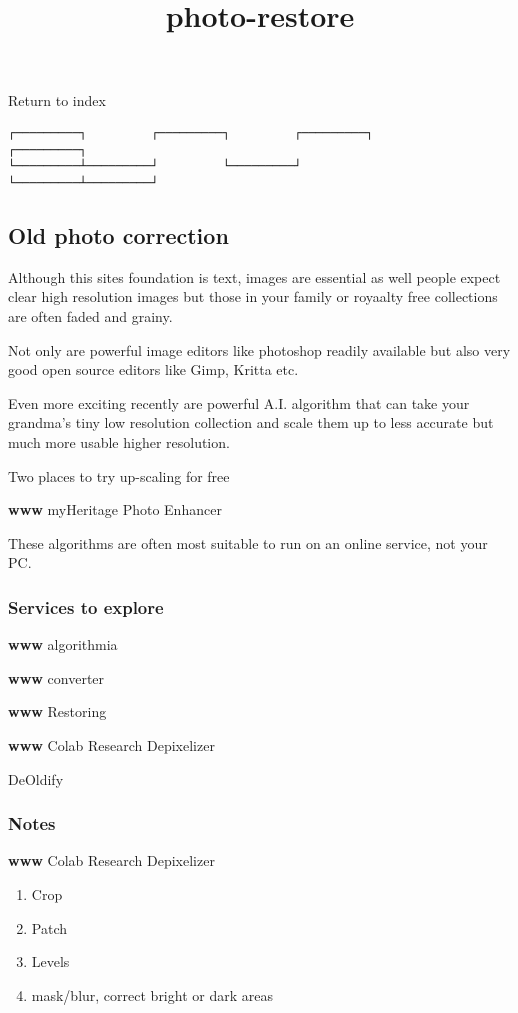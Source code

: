\documentclass[
]{article}
\title{photo-restore}
\author{}
\date{}
\providecommand{\tightlist}{%
  \setlength{\itemsep}{0pt}\setlength{\parskip}{0pt}}
\begin{document}
\maketitle

Return to index

\begin{verbatim}
┌─────────┐         ┌─────────┐         ┌─────────┐         ┌─────────┐
└─────────┴─────────┘         └─────────┘         └─────────┴─────────┘
\end{verbatim}

\subsection{Old photo correction}

Although this sites foundation is text, images are essential as well
people expect clear high resolution images but those in your family or
royaalty free collections are often faded and grainy.

Not only are powerful image editors like photoshop readily available but
also very good open source editors like Gimp, Kritta etc.

Even more exciting recently are powerful A.I. algorithm that can take
your grandma's tiny low resolution collection and scale them up to less
accurate but much more usable higher resolution.

Two places to try up-scaling for free

\textbf{www} myHeritage Photo Enhancer

These algorithms are often most suitable to run on an online service,
not your PC.

\subsubsection{Services to explore}

\textbf{www} algorithmia

\textbf{www} converter

\textbf{www} Restoring

\textbf{www} Colab Research Depixelizer

DeOldify

\subsubsection{Notes}

\textbf{www} Colab Research Depixelizer

\begin{enumerate}
\def\labelenumi{\arabic{enumi}.}
\tightlist
\item
  Crop
\item
  Patch
\item
  Levels
\item
  mask/blur, correct bright or dark areas
\end{enumerate}
\end{document}
